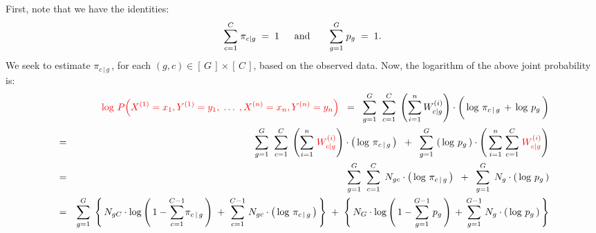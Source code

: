 First, note that we have the identities:
\begin{equation*}
\overset{C}{\underset{c=1}{\sum}}\;\pi_{c\vert g} \; = \; 1
\;\;\quad\textnormal{and}\quad\quad
\overset{G}{\underset{g=1}{\sum}}\;p_{g} \; = \; 1.
\end{equation*}
We seek to estimate $\pi_{c\,\vert\,g}$\,,
for each $(g,c) \in \left[\,G\,\right] \times \left[\,C\,\right]$,
based on the observed data.
Now, the logarithm of the above joint probability is:
\begin{eqnarray*}
&&
	{\color{red}\log\,P\!\left(X^{(1)} = x_{1},Y^{(1)}=y_{1}, \;\ldots\; ,X^{(n)} = x_{n},Y^{(n)}=y_{n}\right)}
\;\;=\;\;
	\overset{G}{\underset{g=1}{\sum}} \;\; \overset{C}{\underset{c=1}{\sum}} \;
	\left(\overset{n}{\underset{i=1}{\sum}}\,W^{(i)}_{c \vert g}\right)
	\cdot
	\left(\,\log\,\pi_{c\,\vert\,g} \,\overset{{\color{white}\vert}}{+}\, \log\,p_{g}\,\right)
\\
&=&
	\overset{G}{\underset{g=1}{\sum}} \;\; \overset{C}{\underset{c=1}{\sum}} \;
	\left(\overset{n}{\underset{i=1}{\sum}}\;{\color{red}W^{(i)}_{c \vert g}}\right)
	\cdot
	\left(\,\log\,\pi_{c\,\vert\,g}\,\right)
	\;\; + \;\;
	\overset{G}{\underset{g=1}{\sum}} \, \left(\,\log\,p_{g}\,\right)
	\cdot
	\left(\,
		\overset{n}{\underset{i=1}{\sum}} \;
		\overset{C}{\underset{c=1}{\sum}} \;
		{\color{red}W^{(i)}_{c \vert g}}
	\right)
\\
&=&
	\overset{G}{\underset{g=1}{\sum}} \;\; \overset{C}{\underset{c=1}{\sum}} \;\,
	N_{gc} \cdot \left(\,\log\,\pi_{c\,\vert\,g}\,\right)
	\;\; + \;\;
	\overset{G}{\underset{g=1}{\sum}} \;\, N_{g} \cdot \left(\,\log\,p_{g}\,\right)
\\
&=&
	\overset{G}{\underset{g=1}{\sum}} \;
	\left\{\,
		N_{gC}
		\cdot
		\log\left(\,1 - \overset{C-1}{\underset{c=1}{\sum}}\pi_{c\,\vert\,g}\,\right)
		\; + \;
		\overset{C-1}{\underset{c=1}{\sum}} \; N_{gc}
		\cdot
		\left(\,\log\,\pi_{c\,\vert\,g}\,\right)
	\,\right\}
	\; + \;
	\left\{\,
		N_{G}
		\cdot
		\log\left(\,1 - \overset{G-1}{\underset{g=1}{\sum}}\;p_{g}\,\right)
		\, + \,
		\overset{G-1}{\underset{g=1}{\sum}} \; N_{g}
		\cdot
		\left(\,\log\,p_{g}\,\right)
	\,\right\}
\end{eqnarray*}
